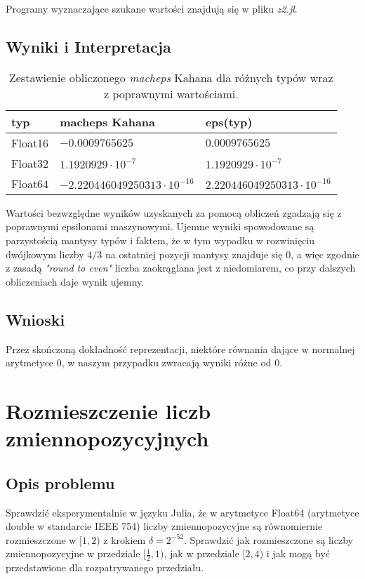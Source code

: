 \documentclass[a4paper]{article}
\begin{document}
    Programy wyznaczające szukane wartości znajdują się w pliku \emph{z2.jl}.  
    
    \subsection{Wyniki i Interpretacja}
 
    \begin{table}[!h]
    \centering
    \begin{tabular}{|l | l | l|}
    \hline
    typ & macheps Kahana & eps(typ) \\ \hline
    Float16 & $-0.0009765625$ & $0.0009765625$ \\
    Float32 & $1.1920929\cdot 10^{-7}$ & $1.1920929\cdot 10^{-7}$ \\
    Float64 & $-2.220446049250313\cdot 10^{-16}$ & $2.220446049250313\cdot 10^{-16}$ \\
    \hline
    \end{tabular}
    \caption{\label{table:4}Zestawienie obliczonego \emph{macheps} Kahana dla różnych typów wraz z poprawnymi wartościami.}
    \end{table}
    
    Wartości bezwzględne wyników uzyskanych za pomocą obliczeń zgadzają się z poprawnymi epsilonami maszynowymi. Ujemne wyniki spowodowane są parzystością mantysy typów i faktem, że w tym wypadku w rozwinięciu dwójkowym liczby $4/{3}$ na ostatniej pozycji mantysy znajduje się $0$, a więc zgodnie z zasadą \textit{"round to even"} liczba zaokrąglana jest z niedomiarem, co przy 
    dalszych obliczeniach daje wynik ujemny.
    
    \subsection{Wnioski}
    Przez skończoną dokładność reprezentacji, niektóre równania dające w normalnej arytmetyce $0$, w naszym przypadku zwracają wyniki różne od 0.

\section{Rozmieszczenie liczb zmiennopozycyjnych}
    \subsection{Opis problemu}
    Sprawdzić eksperymentalnie w języku Julia, że w arytmetyce Float64 (arytmetyce double w standarcie IEEE 754) liczby zmiennopozycyjne są równomiernie rozmieszczone w $[1, 2)$ z krokiem \(\delta = 2^{-52}\).
    Sprawdzić jak rozmieszczone są liczby zmiennopozycyjne w przedziale $[\frac{1}{2} , 1)$, jak w przedziale $[2, 4)$ i jak mogą być przedstawione dla rozpatrywanego przedziału.
    
\end{document}
